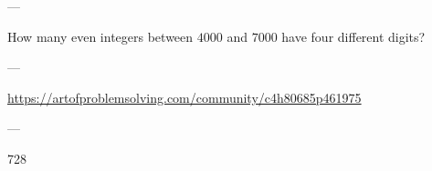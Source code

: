 
---

How many even integers between $4000$ and $7000$ have four different digits?

---

\url{https://artofproblemsolving.com/community/c4h80685p461975}

---

728
